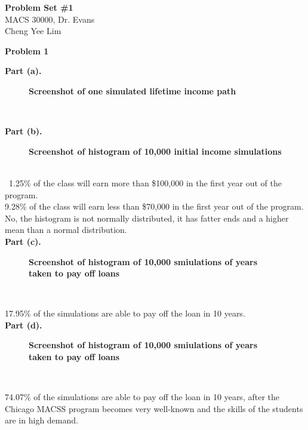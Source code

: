 \documentclass[letterpaper,12pt]{article}
\theoremstyle{definition}
\begin{document}
\begin{flushleft}
  \textbf{\large{Problem Set \#1}} \\
  MACS 30000, Dr. Evans \\
  Cheng Yee Lim
\end{flushleft}

\vspace{5mm}

\noindent\textbf{Problem 1}

\textbf{Part (a).}\
\begin{figure}[htb]\centering\captionsetup{width=4.0in}
  \caption{\textbf{Screenshot of one simulated lifetime income path}}\label{Fig. 1a}
  \fbox{\resizebox{4.0in}{3.0in}{\texttt{[image: images/Fig\_1a.png]}}}
\end{figure}\

\clearpage
\textbf{Part (b).}\
\begin{figure}[htb]\centering\captionsetup{width=4.0in}
  \caption{\textbf{Screenshot of histogram of 10,000 initial income simulations}}\label{Fig. 1b}
\end{figure}\\\
1.25\% of the class will earn more than \$100,000 in the first year out of the program.\\
9.28\% of the class will earn less than \$70,000 in the first year out of the program.\\
No, the histogram is not normally distributed, it has fatter ends and a higher mean than a normal distribution.\\

\clearpage
\textbf{Part (c).}\

\begin{figure}[htb]\centering\captionsetup{width=4.0in}
  \caption{\textbf{Screenshot of histogram of 10,000 smiulations of years taken to pay off loans}}\label{Fig. 1c}
\end{figure}\

17.95\% of the simulations are able to pay off the loan in 10 years.\\

\clearpage
\textbf{Part (d).}\

\begin{figure}[htb]\centering\captionsetup{width=4.0in}
  \caption{\textbf{Screenshot of histogram of 10,000 smiulations of years taken to pay off loans}}\label{Fig. 1d}
\end{figure}\

74.07\% of the simulations are able to pay off the loan in 10 years, after the Chicago MACSS program becomes very well-known and the skills of the students are in high demand.\\
\end{document}
